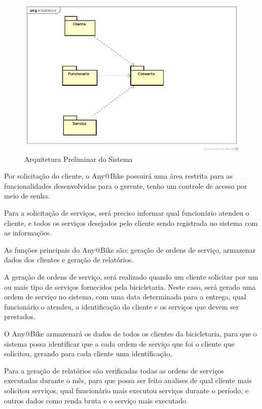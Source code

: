 \documentclass[
	12pt,				%
	openright,
	oneside,			%
	a4paper,			%
	chapter=TITLE,		%
	brazil				%
	]{abntex2}
\begin{document}
\begin{figure}[hb]
	\caption{Arquitetura Preliminar do Sistema}
	\begin{center}
	    \includegraphics[scale=0.4]{Arquivos/diagrama_arquitetura}
	\end{center}
\end{figure}


Por solicitação do cliente, o Any@Bike possuirá uma área restrita para as funcionalidades desenvolvidas  para o gerente, tenho um controle de acesso por meio de senha. 

Para a solicitação de serviços, será preciso informar qual funcionário atendeu o cliente, e todos os serviços desejados pelo cliente sendo registrada no sistema com as informações. 

As funções principais do Any@Bike são: geração de ordens de serviço, armazenar dados dos clientes e geração de relatórios. 

A geração de ordens de serviço, será realizado quando um cliente solicitar por um ou mais tipo de serviços fornecidos pela bicicletaria. Neste caso, será gerado uma ordem de serviço no sistema, com uma data determinada para a entrega, qual funcionário o atendeu,  a identificação do cliente e os serviços que devem ser prestados.

O Any@Bike armazenará os dados de todos os clientes da bicicletaria, para que o sistema possa identificar que a cada ordem de serviço que foi o cliente que solicitou, gerando para cada cliente uma identificação. 

Para a geração de relatórios são verificadas todas as ordens de serviços executadas durante o mês, para que possa ser feito analises de qual cliente mais solicitou serviços, qual funcionário mais executou serviços durante o período, e outros dados como renda bruta e  o serviço mais executado.  
\end{document}
